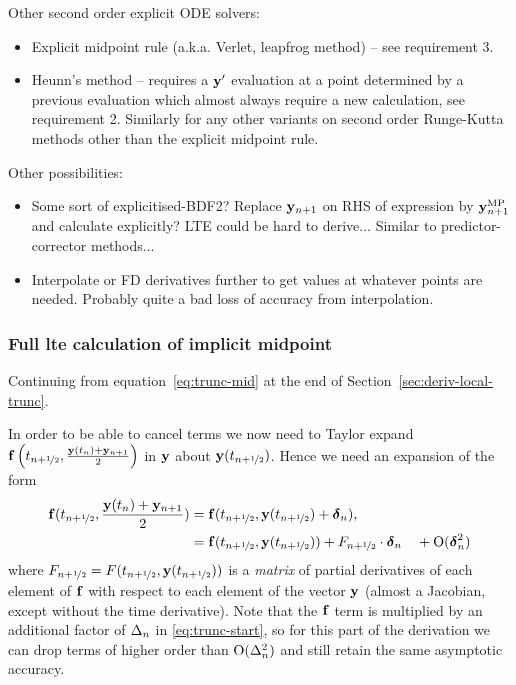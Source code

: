 Other second order explicit ODE solvers:
\begin{itemize}
\item Explicit midpoint rule (a.k.a. Verlet, leapfrog method) -- see requirement 3.
\item Heunn's method -- requires a $\mathbf{y}'$ evaluation at a point determined by a previous evaluation which almost always require a new calculation, see requirement 2. Similarly for any other variants on second order Runge-Kutta methods other than the explicit midpoint rule.
\end{itemize}


Other possibilities:
\begin{itemize}
\item Some sort of explicitised-BDF2? Replace $\mathbf{y}_{n+1}$ on RHS of expression by $\mathbf{y}_{n+1}^{\text{MP}}$ and calculate explicitly? LTE could be hard to derive... Similar to predictor-corrector methods...
\item Interpolate or FD derivatives further to get values at whatever points are needed. Probably quite a bad loss of accuracy from interpolation.
\end{itemize}


\subsubsection{Full lte calculation of implicit midpoint}
\label{sec:full-imr-lte-calculation}

Continuing from equation~\eqref{eq:trunc-mid} at the end of Section~\ref{sec:deriv-local-trunc}.

In order to be able to cancel terms we now need to Taylor expand ${\mathbf{f}}\left( t_{n+\nicefrac{1}{2}}, \frac{\mathbf{y}(t_n) + \mathbf{y}_{n+1}}{2} \right)$ in $\mathbf{y}$ about $\mathbf{y}(t_{n+\nicefrac{1}{2}})$.
Hence we need an expansion of the form
\begin{align}
  {\mathbf{f}}(t_{n+\nicefrac{1}{2}}, \frac{\mathbf{y}(t_n) + \mathbf{y}_{n+1}}{2}) &= {\mathbf{f}}(t_{n+\nicefrac{1}{2}}, \mathbf{y}(t_{n+\nicefrac{1}{2}}) + \mbox{\boldmath$\delta$}_{n}),
  \notag \\
  &= {\mathbf{f}}(t_{n+\nicefrac{1}{2}}, \mathbf{y}(t_{n+\nicefrac{1}{2}})) + F_{n+\nicefrac{1}{2}} \cdot \mbox{\boldmath$\delta$}_{n}  \quad + \text{O}(\mbox{\boldmath$\delta$}_{n}^2)
  \label{eq:f-taylor}
\end{align}
where $F_{n+\nicefrac{1}{2}} = F(t_{n+\nicefrac{1}{2}}, \mathbf{y}(t_{n+\nicefrac{1}{2}}))$ is a \emph{matrix} of partial derivatives of each element of ${\mathbf{f}}$ with respect to each element of the vector $\mathbf{y}$ (\ie almost a Jacobian, except without the time derivative).
Note that the ${\mathbf{f}}$ term is multiplied by an additional factor of $\Delta_{n}$ in \eqref{eq:trunc-start}, so for this part of the derivation we can drop terms of higher order than $\text{O}(\Delta_{n}^2)$ and still retain the same asymptotic accuracy.


